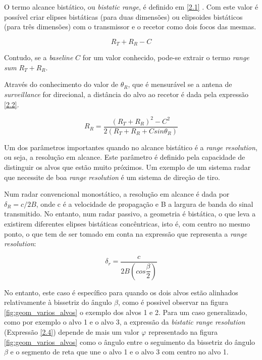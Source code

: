O termo alcance bistático, ou \textit{bistatic range}, é definido em \ref{2.1} \parencite{Griffiths2017}. Com este valor é possível criar elipses bistáticas (para duas dimensões) ou elipsoides bistáticos (para três dimensões) com o transmissor e o recetor como dois focos das mesmas. \par

\begin{equation} \label{2.1} 
R_{T}+R_{R}-C 
\end{equation}

Contudo, se a \textit{baseline} $C$ for um valor conhecido, pode-se extrair o termo \textit{range sum} $R_{T}+R_{R}$. \par
Através do conhecimento do valor de $\theta_{R}$, que é mensurável se a antena de \textit{surveillance} for direcional, a distância do alvo ao recetor é dada pela expressão \ref{2.2}.

\begin{equation} \label{2.2}
R_{R}=\dfrac{\left(  R_{T}+R_{R}\right)^{2}-C^{2}}{2\left(  R_{T}+R_{R}+C sin\theta_{R}\right)}
\end{equation}


Um dos parâmetros importantes quando no alcance bistático é a \textit{range resolution}, ou seja, a resolução em alcance. Este parâmetro é definido pela capacidade de distinguir os alvos que estão muito próximos. Um exemplo de um sistema radar que necessite de boa \textit{range resolution} é um sistema de direção de tiro. \par 

Num radar convencional monostático, a resolução em alcance é dada por $\delta_{R}=c/2B$, onde c é a velocidade de propagação e B a largura de banda do sinal transmitido. No entanto, num radar passivo, a geometria é bistática, o que leva a existirem diferentes elipses bistáticas concêntricas, isto é, com centro no mesmo ponto, o que tem de ser tomado em conta na expressão que representa a \textit{range resolution}:

\begin{equation} \label{2.3}
\delta_{r}=\dfrac{c}{2B\left( cos\dfrac{\beta}{2}\right)}
\end{equation}

No entanto, este caso é específico para quando os dois alvos estão alinhados relativamente à bissetriz do ângulo $\beta$, como é possivel observar na figura \ref{fig:geom_varios_alvos} o exemplo dos alvos 1 e 2. Para um caso generalizado, como por exemplo o alvo 1 e o alvo 3, a expressão da \textit{bistatic range resolution} (Expressão \ref{2.4}) depende de mais um valor $\varphi$ representado na figura \ref{fig:geom_varios_alvos} como o ângulo entre o seguimento da bissetriz do ângulo $\beta$ e o segmento de reta que une o alvo 1 e o alvo 3 com centro no alvo 1. 


